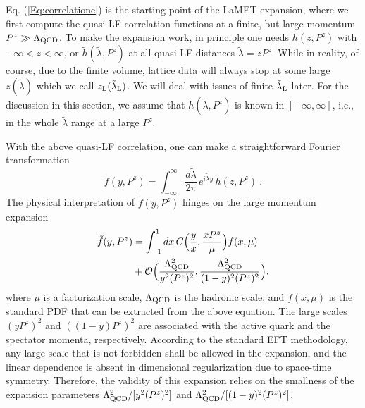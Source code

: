 \documentclass[preprint,12pt]{elsarticle}
\begin{document}
Eq. (\ref{Eq:correlatione}) is the starting point
of the LaMET expansion, where we first
compute the quasi-LF correlation functions at a finite,
but large momentum $P^z\gg\Lambda_{\rm QCD}$.
To make the expansion work, in principle one needs ${\tilde h}(z, P^z)$ with $-\infty<z<\infty$, or
${\tilde h}(\tilde \lambda, P^z)$ at all quasi-LF distances $\tilde \lambda=z P^z$.
While in reality, of course, due to
the finite volume, lattice data will always stop at some
large $z(\tilde \lambda)$ which we call $z_{\rm L}(\tilde \lambda_{\rm L})$. We will
deal with issues of finite $\tilde \lambda_{\rm L}$ later.
For the discussion in this section, we assume that $\tilde h(\tilde \lambda, P^z)$
is known in $[-\infty,\infty]$, i.e., in the whole $\tilde \lambda$ range at a large
$P^z$.

With the above quasi-LF correlation, one can make a straightforward
Fourier transformation
\begin{equation}
    {\tilde f}(y,P^z) =\int^\infty_{-\infty} \frac{d\tilde \lambda}{2\pi}\, e^{i\tilde \lambda y}\, \tilde h(z, P^z)\ .
\end{equation}
The physical interpretation of ${\tilde f}(y,P^z)$ hinges on the large momentum
expansion~\cite{Ji:2013dva,Xiong:2013bka,Ma:2014jla,Izubuchi:2018srq}
\begin{align}\label{matching}
    {\tilde f}(y, P^z) &= \int^1_{-1} dx\, C\Big(\frac y x, \frac{xP^z}{\mu}\Big) f(x, \mu) \nonumber \\
    &+ {\cal O}\Big(\frac{\Lambda^2_{\rm QCD}}{y^2(P^z)^2}, \frac{\Lambda^2_{\rm QCD}}{(1-y)^2(P^z)^2}\Big),
\end{align}
where $\mu$ is a factorization scale, $\Lambda_{\rm QCD}$ is the hadronic scale, and
$f(x,\mu)$ is the standard PDF that can be extracted from the above equation.
The large scales $(yP^z)^2$ and $((1-y)P^z)^2$ are associated with the active quark
and the spectator momenta, respectively. According to the standard EFT methodology, 
any large scale that is not forbidden shall be allowed in the expansion, and the linear
dependence is absent in dimensional regularization due to space-time symmetry.    
Therefore, the validity of this expansion relies on the smallness of the expansion
parameters $\Lambda^2_{\rm QCD}/[y^2(P^z)^2]$ and $\Lambda^2_{\rm QCD}/[(1-y)^2(P^z)^2]$. 
\end{document}
